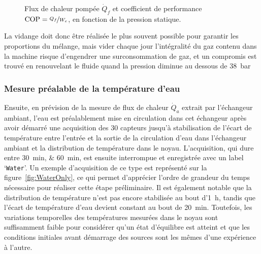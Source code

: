 \begin{figure}[!ht]
    \centering
	\begin{subfigure}{\textwidth}
		\centering
		
		\caption{}
		\label{fig:Qc_PressStatique}
	\end{subfigure}
		
	\vspace{1em}
	
	\begin{subfigure}{\textwidth}
		\centering
		
		\caption{}
		\label{fig:COP_PressStatique}
	\end{subfigure}
    \caption{ Flux de chaleur pompée $\dot Q_f$ et  coefficient de performance $\mathrm{COP}=\nicefrac{Q_f}{W_e}$, en fonction de la pression statique.}
    \label{fig:PressStatique}
\end{figure}

La vidange doit donc être réalisée le plus souvent possible pour garantir les proportions du mélange, mais vider chaque jour l'intégralité du gaz contenu dans la machine risque d'engendrer une surconsommation de gaz, et un compromis est trouvé en renouvelant le fluide quand la pression diminue au dessous de \qty{38}{\bar}

\subsubsection{Mesure préalable de la température d'eau}

Ensuite, en prévision de la mesure de flux de chaleur $\dot Q_a$ extrait par l'échangeur ambiant, l'eau est préalablement mise en circulation dans cet échangeur après avoir démarré une acquisition des 30 capteurs jusqu'à stabilisation de l'écart de température entre l'entrée et la sortie de la circulation d'eau dans l'échangeur ambiant et la distribution de température dans le noyau. L'acquisition, qui dure entre \qtylist{30;60}{\minute}, est ensuite interrompue et enregistrée avec un label `\texttt{Water}'. Un exemple d'acquisition de ce type est représenté sur la figure~\ref{fig:WaterOnly}, ce qui permet d'apprécier l'ordre de grandeur du temps nécessaire pour réaliser cette étape préliminaire. Il est également notable que la distribution de température  n'est pas encore stabilisée au bout d'\qty{1}{\hour}, tandis que l'écart de température d'eau devient constant au bout de \qty{20}{\minute}. Toutefois, les variations temporelles des températures mesurées dans le noyau sont suffisamment faible pour considérer qu'un état d'équilibre est atteint et que les conditions initiales avant démarrage des sources sont les mêmes d'une expérience à l'autre.\medskip

